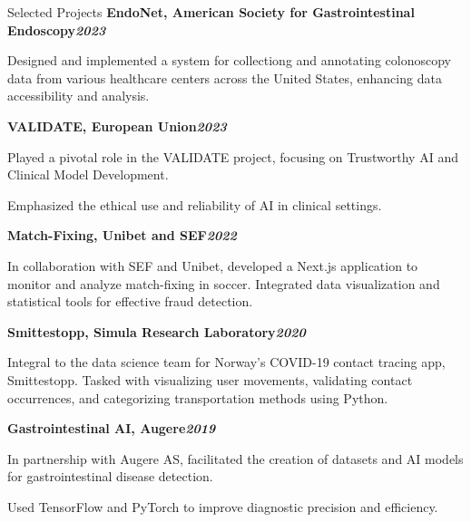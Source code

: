 \begin{rubric}{Selected Projects}
%
\entry*[]%
\textbf{EndoNet, American Society for Gastrointestinal Endoscopy\hfill\textit{}\hfill\textit{2023}} \par
\begin{compactitem}
\item Designed and implemented a system for collectiong and annotating colonoscopy data from various healthcare centers across the United States, enhancing data accessibility and analysis.
\vspace{-12pt}
\end{compactitem}
%
\entry*[]%
\textbf{VALIDATE, European Union\hfill\textit{2023}}
\begin{compactitem}
\item Played a pivotal role in the VALIDATE project, focusing on Trustworthy AI and Clinical Model Development.
\item Emphasized the ethical use and reliability of AI in clinical settings.
\vspace{-12pt}
\end{compactitem}
%
\entry*[]%
\textbf{Match-Fixing, Unibet and SEF\hfill\textit{2022}} \par
\begin{compactitem}
\item In collaboration with SEF and Unibet, developed a Next.js application to monitor and analyze match-fixing in soccer. Integrated data visualization and statistical tools for effective fraud detection.
\vspace{-12pt}
\end{compactitem}
%
\entry*[]%
\textbf{Smittestopp, Simula Research Laboratory\hfill\textit{2020}} \par
\begin{compactitem}
\item Integral to the data science team for Norway's COVID-19 contact tracing app, Smittestopp. Tasked with visualizing user movements, validating contact occurrences, and categorizing transportation methods using Python.
\vspace{-12pt}
\end{compactitem}
%
\entry*[]%
\textbf{Gastrointestinal AI, Augere\hfill\textit{2019}} \par
\begin{compactitem}
\item In partnership with Augere AS, facilitated the creation of datasets and AI models for gastrointestinal disease detection.
\item Used TensorFlow and PyTorch to improve diagnostic precision and efficiency.

\end{compactitem}
\end{rubric}
